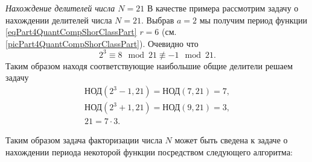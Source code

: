 \begin{example}
\emph{Нахождение делителей числа $N=21$}
\label{exPart4QuantCompShorGCD}
В качестве примера рассмотрим задачу о нахождении делителей числа $N =
21$. Выбрав $a=2$ мы получим период функции
\eqref{eqPart4QuantCompShorClassPart} $r = 6$ (см.
\autoref{picPart4QuantCompShorClassPart}). 
Очевидно что 
\[
2^3 \equiv 8 \mod{21} \not\equiv -1 \mod{21}.
\]
Таким образом находя соответствующие наибольшие общие делители решаем
задачу
\begin{eqnarray}
\mbox{НОД}\left( 2^3 - 1, 21 \right) = \mbox{НОД}\left( 7, 21 \right)
= 7,
\nonumber \\
\mbox{НОД}\left( 2^3 + 1, 21 \right) = \mbox{НОД}\left( 9, 21 \right)
= 3,
\nonumber \\
21 = 7 \cdot 3.
\nonumber
\end{eqnarray}
\end{example}

Таким образом задача факторизации числа $N$ может быть сведена к
задаче о нахождении периода некоторой функции посредством следующего
алгоритма:

